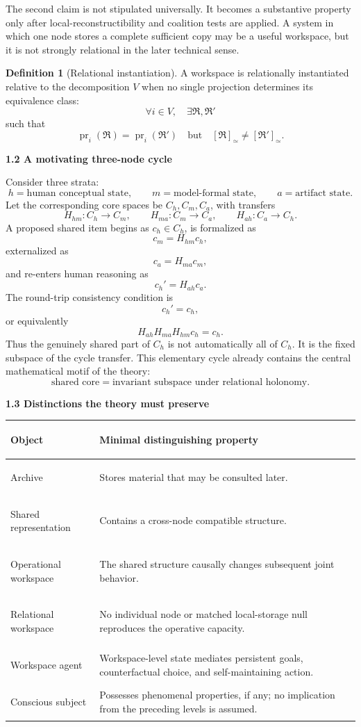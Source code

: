 \documentclass[11pt,letterpaper]{article}
\DeclareMathOperator{\pr}{pr}
\newcommand{\subtopic}[1]{%
 \vspace{0.45em}
 {\bfseries\color{AccentColor} #1\par}
}
\theoremstyle{plain}
\theoremstyle{definition}
\newtheorem{definition}[theorem]{Definition}
\begin{document}
The second claim is not stipulated universally. It becomes a substantive
property only after local-reconstructibility and coalition tests are applied.
A system in which one node stores a complete sufficient copy may be a useful
workspace, but it is not strongly relational in the later technical sense.

\begin{definition}[Relational instantiation]\label{def:relational-instantiation}
A workspace is relationally instantiated relative to the decomposition
\(V\) when no single projection determines its equivalence class:
\[
\forall i\in V,\quad
\exists\mathfrak R,\mathfrak R'
\]
such that
\[
\pr_i(\mathfrak R)=\pr_i(\mathfrak R')
\quad\text{but}\quad
[\mathfrak R]_{\simeq}\neq[\mathfrak R']_{\simeq}.
\]
\end{definition}

\subtopic{1.2 A motivating three-node cycle}

Consider three strata:
\[
h=\text{human conceptual state},\qquad
m=\text{model-formal state},\qquad
a=\text{artifact state}.
\]
Let the corresponding core spaces be \(C_h,C_m,C_a\), with transfers
\[
H_{hm}:C_h\to C_m,
\qquad
H_{ma}:C_m\to C_a,
\qquad
H_{ah}:C_a\to C_h.
\]
A proposed shared item begins as \(c_h\in C_h\), is formalized as
\[
c_m=H_{hm}c_h,
\]
externalized as
\[
c_a=H_{ma}c_m,
\]
and re-enters human reasoning as
\[
c_h'=H_{ah}c_a.
\]
The round-trip consistency condition is
\[
c_h'=c_h,
\]
or equivalently
\[
\boxed{
H_{ah}H_{ma}H_{hm}c_h=c_h.
}
\]
Thus the genuinely shared part of \(C_h\) is not automatically all of
\(C_h\). It is the fixed subspace of the cycle transfer. This elementary
cycle already contains the central mathematical motif of the theory:
\[
\text{shared core}=\text{invariant subspace under relational holonomy}.
\]

\subtopic{1.3 Distinctions the theory must preserve}

\begin{center}
\small
\begin{tabularx}{\textwidth}{@{}>{\bfseries\raggedright\arraybackslash}p{}>{\raggedright\arraybackslash}X@{}}
\toprule
Object & Minimal distinguishing property \\
\midrule
Archive & Stores material that may be consulted later. \\
Shared representation & Contains a cross-node compatible structure. \\
Operational workspace & The shared structure causally changes subsequent joint behavior. \\
Relational workspace & No individual node or matched local-storage null reproduces the operative capacity. \\
Workspace agent & Workspace-level state mediates persistent goals, counterfactual choice, and self-maintaining action. \\
Conscious subject & Possesses phenomenal properties, if any; no implication from the preceding levels is assumed. \\
\bottomrule
\end{tabularx}
\end{center}
\end{document}
